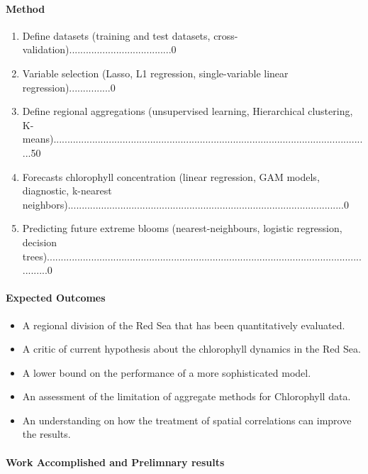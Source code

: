\paragraph{Method}

\begin{enumerate}
\item Define datasets (training and test datasets, cross-validation).....................................0%
\item Variable selection (Lasso, L1 regression, single-variable linear regression)...............0%
\item Define regional aggregations (unsupervised learning, Hierarchical clustering, K-means)...................................................................................................................50%
\item Forecasts chlorophyll concentration (linear regression, GAM models, diagnostic, k-nearest neighbors)....................................................................................................0%
\item Predicting future extreme blooms (nearest-neighbours, logistic regression, decision trees)...........................................................................................................................0%
\end{enumerate}

\paragraph{Expected Outcomes}

\begin{itemize}
\item A regional division of the Red Sea that has been quantitatively evaluated.
\item A critic of current hypothesis about the chlorophyll dynamics in the Red Sea.
\item A lower bound on the performance of a more sophisticated model.
\item An assessment of the limitation of aggregate methods for Chlorophyll data.
\item An understanding on how the treatment of spatial correlations can improve the results.
\end{itemize}

\paragraph{Work Accomplished and Prelimnary results}
